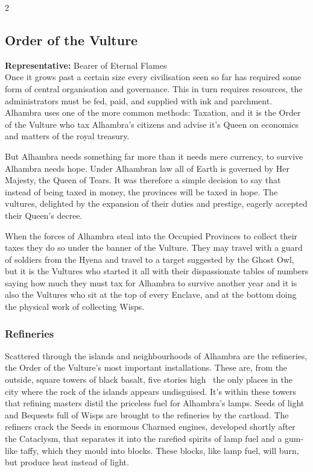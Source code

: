 \begin{multicols}{2}
\subsection*{Order of the Vulture}

\textbf{Representative:} Bearer of Eternal Flames\\

\noindent Once it grows past a certain size every civilisation seen so far has required some form of central organisation and governance. This in turn requires resources, the administrators must be fed, paid, and supplied with ink and parchment. Alhambra uses one of the more common methods: Taxation, and it is the Order of the Vulture who tax Alhambra's citizens and advise it's Queen on economics and matters of the royal treasury. 

But Alhambra needs something far more than it needs mere currency, to survive Alhambra needs hope. Under Alhambran law all of Earth is governed by Her Majesty, the Queen of Tears. It was therefore a simple decision to say that instead of being taxed in money, the provinces will be taxed in hope. The vultures, delighted by the expansion of their duties and prestige, eagerly accepted their Queen's decree. 

When the forces of Alhambra steal into the Occupied Provinces to collect their taxes they do so under the banner of the Vulture. They may travel with a guard of soldiers from the Hyena and travel to a target suggested by the Ghost Owl, but it is the Vultures who started it all with their dispassionate tables of numbers saying how much they must tax for Alhambra to survive another year and it is also the Vultures who sit at the top of every Enclave, and at the bottom doing the physical work of collecting Wisps. 

\subsubsection*{Refineries}

Scattered through the islands and neighbourhoods of Alhambra are the refineries, the Order of the Vulture's most important installations. These are, from the outside, square towers of black basalt, five stories high \textendash\, the only places in the city where the rock of the islands appears undisguised. It's within these towers that refining masters distil the priceless fuel for Alhambra's lamps. Seeds of light and Bequests full of Wisps are brought to the refineries by the cartload. The refiners crack the Seeds in enormous Charmed engines, developed shortly after the Cataclysm, that separates it into the rarefied spirits of lamp fuel and a gum-like taffy, which they mould into blocks. These blocks, like lamp fuel, will burn, but produce heat instead of light. 


\end{multicols}
